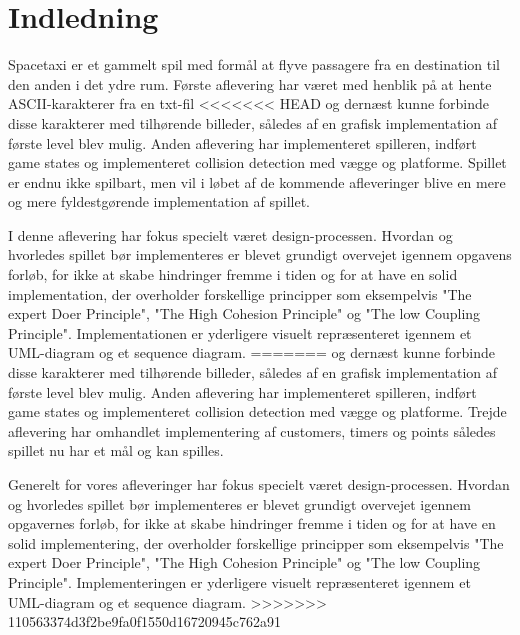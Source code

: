 

\section{Indledning}

Spacetaxi er et gammelt spil med formål at flyve passagere fra en destination til den anden i det ydre rum. Første aflevering har været med henblik på at hente ASCII-karakterer fra en txt-fil
<<<<<<< HEAD
og dernæst kunne forbinde disse karakterer med tilhørende billeder, således af en grafisk implementation af første level blev mulig. Anden aflevering har implementeret spilleren, indført game states og implementeret collision detection med vægge og platforme. Spillet er endnu ikke spilbart, men vil i løbet af de kommende afleveringer blive en mere og mere fyldestgørende implementation af spillet.

I denne aflevering har fokus specielt været design-processen. Hvordan og hvorledes spillet bør implementeres er blevet grundigt overvejet igennem opgavens forløb, for ikke at skabe hindringer fremme i tiden og for at have en solid implementation, der overholder forskellige principper som eksempelvis "The expert Doer Principle", "The High Cohesion Principle" og "The low Coupling Principle".
Implementationen er yderligere visuelt repræsenteret igennem et UML-diagram og et sequence diagram.
=======
og dernæst kunne forbinde disse karakterer med tilhørende billeder, således af en grafisk implementation af første level blev mulig. Anden aflevering har implementeret spilleren, indført game states og implementeret collision detection med vægge og platforme. Trejde aflevering har omhandlet implementering af customers, timers og points således spillet nu har et mål og kan spilles.

Generelt for vores afleveringer har fokus specielt været design-processen. Hvordan og hvorledes spillet bør implementeres er blevet grundigt overvejet igennem opgavernes forløb, for ikke at skabe hindringer fremme i tiden og for at have en solid implementering, der overholder forskellige principper som eksempelvis "The expert Doer Principle", "The High Cohesion Principle" og "The low Coupling Principle".
Implementeringen er yderligere visuelt repræsenteret igennem et UML-diagram og et sequence diagram.
>>>>>>> 110563374d3f2be9fa0f1550d16720945c762a91


